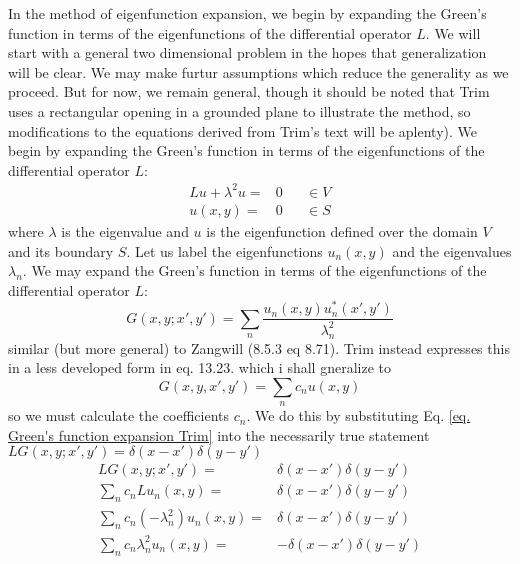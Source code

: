 \documentclass[../../main.tex]{subfiles} %
\begin{document}
In the method of eigenfunction expansion, we begin by expanding the Green's function in terms of the eigenfunctions of the differential operator $L$. We will start with a general two dimensional problem in the hopes that generalization will be clear. We may make furtur assumptions which reduce the generality as we proceed. But for now, we remain general, though it should be noted that Trim uses a rectangular opening in a grounded plane to illustrate the method, so modifications to the equations derived from Trim's text will be aplenty). We begin by expanding the Green's function in terms of the eigenfunctions of the differential operator $L$: 
\begin{equation}\label{eq. Green's function eigenvalue problem}
    \begin{aligned}
        Lu+\lambda^2u=&0 & & \in V\\
        u(x,y)=&0 & & \in S
    \end{aligned}
\end{equation}
where $\lambda$ is the eigenvalue and $u$ is the eigenfunction defined over the domain $V$ and its boundary $S$. Let us label the eigenfunctions $u_n(x,y)$ and the eigenvalues $\lambda_n$. We may expand the Green's function in terms of the eigenfunctions of the differential operator $L$:
\begin{equation}\label{eq. Green's function expansion}
    G(x,y;x',y')=\sum_n\frac{u_n(x,y)u_n^*(x',y')}{\lambda_n^2}
\end{equation}
similar (but more general) to Zangwill (8.5.3 eq 8.71). Trim instead expresses this in a less developed form in eq. 13.23. which i shall gneralize to 
\begin{equation}\label{eq. Green's function expansion Trim}
    G(x,y,x',y')=\sum_n c_n u(x,y)
\end{equation}
so we must calculate the coefficients $c_n$. We do this by substituting Eq. \ref{eq. Green's function expansion Trim} into the necessarily true statement $LG(x,y;x',y')=\delta(x-x')\delta(y-y')$ 
\begin{equation}\label{eq. Green's function expansion Trim2}
    \begin{aligned}
        LG(x,y;x',y')=&\delta(x-x')\delta(y-y')\\
        \sum_n c_n Lu_n(x,y)=&\delta(x-x')\delta(y-y')\\
        \sum_n c_n (-\lambda_n^2)u_n(x,y)=&\delta(x-x')\delta(y-y')\\
        \sum_n c_n \lambda_n^2u_n(x,y)=&-\delta(x-x')\delta(y-y')
    \end{aligned}
\end{equation}
\end{document}
